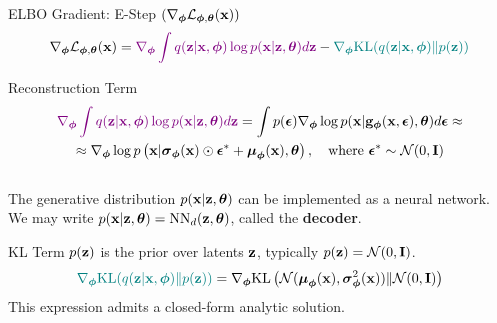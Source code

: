 \documentclass{beamer}
\begin{document}
\begin{frame}{ELBO Gradient: E-Step $(\nabla_{\bphi} \cL_{\bphi, \btheta}(\bx))$}
	\vspace{-0.3cm}
	\[
		\nabla_{\bphi} \cL_{\bphi, \btheta}(\bx) = {\color{violet}\nabla_{\bphi} \int q(\bz | \bx, \bphi)\log p(\bx | \bz, \btheta) d \bz} - {\color{teal}\nabla_{\bphi} \KL(q(\bz | \bx, \bphi) \| p(\bz))}
	\]
	\eqpause
	\vspace{-0.3cm}
	\begin{block}{Reconstruction Term}
		\vspace{-0.7cm}
		\begin{multline*}
			 {\color{violet}\nabla_{\bphi} \int q(\bz | \bx, \bphi)\log p(\bx | \bz, \btheta) d \bz} = \int p(\bepsilon) \nabla_{\bphi} \log p(\bx | \bg_{\bphi}(\bx, \bepsilon), \btheta) d\bepsilon \approx \\
			 \approx \nabla_{\bphi} \log p\left(\bx | \bsigma_{\bphi}(\bx) \odot \bepsilon^* + \bmu_{\bphi}(\bx), \btheta\right), \quad \text{where } \bepsilon^* \sim \cN(0, \bI)
		\end{multline*}
		\eqpause
		\vspace{-0.5cm} \\
		The generative distribution $p(\bx | \bz, \btheta)$ can be implemented as a neural network. \\
		We may write $p(\bx | \bz, \btheta) = \text{NN}_d(\bz, \btheta)$, called the \textbf{decoder}.
	\end{block}
	\begin{block}{KL Term}
		$p(\bz)$ is the prior over latents $\bz$, typically $p(\bz) = \cN (0, \bI)$.
		\[
			{\color{teal}\nabla_{\bphi} \KL(q(\bz | \bx, \bphi) \| p(\bz))} = \nabla_{\bphi} \KL\left( \cN (\bmu_{\bphi}(\bx), \bsigma^2_{\bphi}(\bx)) \| \cN (0, \bI) \right)
		\]
		\eqpause
		This expression admits a closed-form analytic solution.
	\end{block}
\end{frame}
\end{document}
